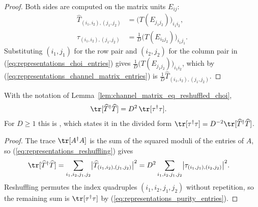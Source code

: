 \begin{proof}\leanok
    Both sides are computed on the matrix units $E_{ij}$:
    \begin{align}
        \widehat{T}_{(i_1,i_2),(j_1,j_2)}
        &= \bigl(T(E_{j_1j_2})\bigr)_{i_1i_2},
        \label{eq:representations_channel_matrix_entries}\\
        \tau_{(i_1,i_2),(j_1,j_2)}
        &= \frac1D\bigl(T(E_{i_2j_2})\bigr)_{i_1j_1}.
        \label{eq:representations_choi_entries}
    \end{align}
    Substituting $(i_1,j_1)$ for the row pair and $(i_2,j_2)$ for the column
    pair in (\ref{eq:representations_choi_entries}) gives
    $\frac1D\bigl(T(E_{j_1j_2})\bigr)_{i_1i_2}$, which by
    (\ref{eq:representations_channel_matrix_entries}) is
    $\frac1D\widehat{T}_{(i_1,i_2),(j_1,j_2)}$.
\end{proof}

\begin{lemma}
    \label{lem:choi_purity_eq_hilbert_schmidt}
    \leanok
    With the notation of Lemma~\ref{lem:channel_matrix_eq_reshuffled_choi},
    \begin{align}
        \tr[\widehat{T}^\dagger\widehat{T}]
        &= D^2\,\tr[\tau^\dagger\tau].
        \label{eq:representations_purity_factor}
    \end{align}
    For $D\geq1$ this is \cite[Eq.~(6.28)]{Wolf2012Quantum}, which states it in
    the divided form $\tr[\tau^\dagger\tau]=D^{-2}\tr[\widehat{T}^\dagger
    \widehat{T}]$.
\end{lemma}

\begin{proof}\leanok
    The trace $\tr[A^\dagger A]$ is the sum of the squared moduli of the
    entries of $A$, so (\ref{eq:representations_reshuffling}) gives
    \begin{align}
        \tr[\widehat{T}^\dagger\widehat{T}]
        &= \sum_{i_1,i_2,j_1,j_2}
            \bigl|\widehat{T}_{(i_1,i_2),(j_1,j_2)}\bigr|^2
         = D^2\sum_{i_1,i_2,j_1,j_2}
            \bigl|\tau_{(i_1,j_1),(i_2,j_2)}\bigr|^2.
        \label{eq:representations_purity_entry_sum}
    \end{align}
    Reshuffling permutes the index quadruples $(i_1,i_2,j_1,j_2)$ without
    repetition, so the remaining sum is $\tr[\tau^\dagger\tau]$ by
    (\ref{eq:representations_purity_entries}).
\end{proof}

